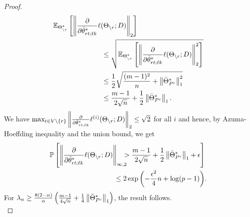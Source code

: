 \begin{proof}
\begin{equation}
\begin{aligned}
&\mathbb{E}_{\Theta^*_{\backslash r}}\left[\left\|\frac{\partial}{\partial\bar{\theta}^*_{r t;\ell k}}\ell(\Theta_{\backslash r}; D)\right\|_{2}\right]\\ &\qquad\qquad\qquad\quad\leq\sqrt{\mathbb{E}_{\Theta^*_{\backslash r}}\left[\left\|\frac{\partial}{\partial\bar{\theta}^*_{r t;\ell k}}\ell(\Theta_{\backslash r}; D)\right\|_{2}^2\right]}\\
&\qquad\qquad\qquad\quad\leq\frac{1}{2}\sqrt{\frac{(m-1)^2}{n}+\left\|\bar{\Theta}^*_{P^c}\right\|_{1}^2}\\
&\qquad\qquad\qquad\quad\leq\frac{m-1}{2\sqrt{n}}+\frac{1}{2}\left\|\bar{\Theta}^*_{P^c}\right\|_{1}.
\end{aligned}
\nonumber
\end{equation}
We have $\max_{t\in V\backslash\{r\}}\left\|\frac{\partial}{\partial\bar{\theta}^*_{r t;\ell k}}\ell^{(i)}(\Theta_{\backslash r}; D)\right\|_{2}\leq\sqrt{2}$ for all $i$ and hence, by Azuma-Hoeffding inequality and the union bound, we get
\begin{equation}
\begin{aligned}
&\mathbb{P}\left[\norm{\frac{\partial}{\partial\bar{\theta}^*_{\svert t;\ell k}}\ell(\Theta_{\backslash \svert}; \Data)}{\infty,2}\!\!\!\!>\frac{m-1}{2\sqrt{n}}+\frac{1}{2}\norm{\bar{\Theta}^*_{P^c}}{1}+\epsilon\right]\\ &\qquad\qquad\qquad\qquad\qquad\!\!\!\!\leq 2\exp\left(-\frac{\epsilon^2}{4}n+\log(p-1)\right)\!.\\
\end{aligned}
\nonumber
\end{equation}
For $\lambda_n\geq \frac{8(2-\alpha)}{\alpha}\left(\frac{m-1}{4\sqrt{n}}+\frac{1}{4}\left\|\bar{\Theta}^*_{P^c}\right\|_{1}\right)$, the result follows.\\


\end{proof}
